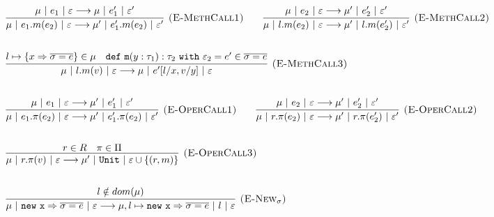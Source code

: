 \documentclass{llncs}
\newcommand{\keywadj}[1]{\mathtt{#1}}
\newcommand{\keyw}[1]{\keywadj{#1}~}
\begin{document}

\[
\begin{array}{lll}
\begin{array}{lllr}
	\infer[\textsc{(E-MethCall1)}]
		{\mu~|~e_1.m(e_2)~|~\varepsilon \longrightarrow \mu'~|~e_1'.m(e_2)~|~\varepsilon'}
		{\mu~|~e_1~|~\varepsilon \longrightarrow \mu~|~e_1'~|~\varepsilon'}
		
		~~~~~~
		
	\infer[\textsc{(E-MethCall2)}]
		{\mu~|~l.m(e_2)~|~\varepsilon \longrightarrow \mu'~|~l.m(e_2')~|~\varepsilon'}
		{\mu~|~e_2~|~\varepsilon \longrightarrow \mu'~|~e_2'~|~\varepsilon'}\\[5ex]
		
	\infer[\textsc{(E-MethCall3)}]
		{\mu~|~l.m(v)~|~\varepsilon
			\longrightarrow
		  \mu~|~e'[l/x, v/y]~|~\varepsilon}
  		{l \mapsto \{ x \Rightarrow \overline{\sigma = e} \} \in \mu & \keywadj{def~m}(y: \tau_1) : \tau_2~\keyw{with} \varepsilon_2 = e' \in \overline {\sigma = e}} \\[5ex]

	\infer[\textsc{(E-OperCall1)}]
		{\mu~|~e_1.\pi(e_2)~|~\varepsilon
			\longrightarrow
		 \mu'~|~e_1'.\pi(e_2)~|~\varepsilon'}
		{\mu~|~e_1~|~\varepsilon \longrightarrow \mu'~|~e_1'~|~\varepsilon'}
~~~~~~
			\infer[\textsc{(E-OperCall2)}]
		{\mu~|~r.\pi(e_2)~|~\varepsilon
			\longrightarrow
		 \mu'~|~r.\pi(e_2')~|~\varepsilon'}
		{\mu~|~e_2~|~\varepsilon \longrightarrow \mu'~|~e_2'~|~\varepsilon'} \\[5ex]
			
			\infer[\textsc{(E-OperCall3)}]
		{\mu~|~r.\pi(v)~|~\varepsilon
			\longrightarrow
		 \mu'~|~\keywadj{Unit}~|~\varepsilon \cup \{(r,m)\}   }
		{r \in R & \pi \in \Pi} \\[5ex]
			
	\infer[\textsc{(E-New$_\sigma$)}]
		{\mu~|~\keywadj{new~x} \Rightarrow \overline{\sigma = e}~|~\varepsilon
			\longrightarrow
		 \mu, l \mapsto \keywadj{new~x} \Rightarrow \overline{\sigma = e}~|~l~|~\varepsilon}
		{l \notin dom(\mu)} \\[5ex]
		
\end{array}
\end{array}
\]
\end{document}
